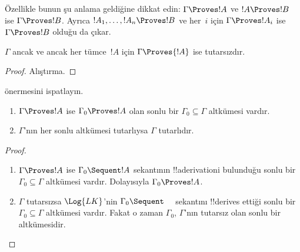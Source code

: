 Özellikle bunun şu anlama geldiğine dikkat edin: $\Gamma \Proves !A$ ve
$!A \Proves !B$ ise $\Gamma \Proves !B$. Ayrıca $!A_1, \dots, !A_n
\Proves !B$ ve her~$i$ için $\Gamma \Proves !A_i$ ise $\Gamma \Proves !B$
olduğu da çıkar.

\begin{prop}
$\Gamma$ ancak ve ancak her tümce~$!A$ için $\Gamma \Proves {!A}$ ise
tutarsızdır.
\end{prop}

\begin{proof}
Alıştırma.
\end{proof}

\begin{prob}
 önermesini ispatlayın.
\end{prob}

\begin{prop}[Tıkızlık]
  \begin{enumerate}
  \item $\Gamma \Proves !A$ ise $\Gamma_0 \Proves !A$ olan sonlu bir
    $\Gamma_0 \subseteq \Gamma$ altkümesi vardır.
  \item $\Gamma$'nın her sonlu altkümesi tutarlıysa $\Gamma$ tutarlıdır.
  \end{enumerate}
\end{prop}

\begin{proof}
  \begin{enumerate}
    \item $\Gamma \Proves !A$ ise $\Gamma_0 \Sequent !A$ sekantının
      !!a{derivation}{}i bulunduğu sonlu bir $\Gamma_0 \subseteq \Gamma$
      altkümesi vardır. Dolayısıyla $\Gamma_0 \Proves !A$.
    \item $\Gamma$ tutarsızsa $\Log{LK}$'nin
      $\Gamma_0 \Sequent \quad$ sekantını !!{derive}s ettiği sonlu bir
      $\Gamma_0 \subseteq \Gamma$ altkümesi vardır. Fakat o zaman
      $\Gamma_0$, $\Gamma$'nın tutarsız olan sonlu bir altkümesidir.
  \end{enumerate}
\end{proof}

